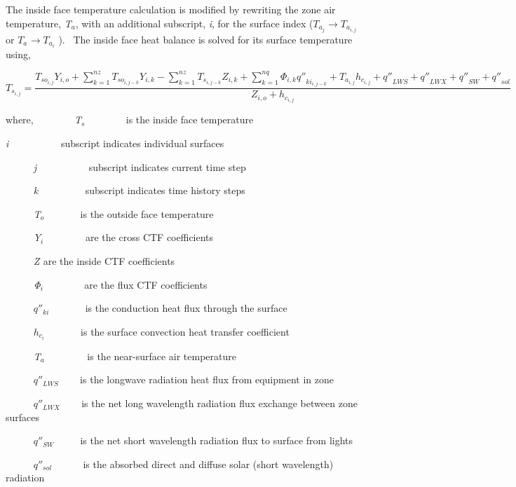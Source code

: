 The inside face temperature calculation is modified by rewriting the zone air temperature, \emph{T\(_{a}\)}, with an additional subscript, \emph{i}, for the surface index (\({T_{{a_j}}} \to {T_{{a_{i,j}}}}\) or \({T_{{a_{}}}} \to {T_{{a_i}}}\) ).~ The inside face heat balance is solved for its surface temperature using,

{\scriptsize
\begin{equation}
{T_{{s_{i,j}}}} = \frac{{{T_{s{o_{i,j}}}}{Y_{i,o}} + \sum\limits_{k = 1}^{nz} {{T_{s{o_{i,j - k}}}}} {Y_{i,k}} - \sum\limits_{k = 1}^{nz} {{T_{{s_{i,j - k}}}}} {Z_{i,k}} + \sum\limits_{k = 1}^{nq} {{\Phi_{i,k}}{{q''}_{k{i_{i,j - k}}}} + {T_{{a_{i,j}}}}{h_{{c_{i,j}}}} + {{q''}_{LWS}} + {{q''}_{LWX}} + {{q''}_{SW}} + {{q''}_{sol}}} }}{{{Z_{i,o}} + {h_{{c_{i,j}}}}}}
\end{equation}}

where, ~~~~~~~ \emph{T\(_{s}\)} ~~~~~~~ is the inside face temperature

\emph{i}~~~~~~~~~~ subscript indicates individual surfaces

~~~~~ \emph{j}~~~~~~~~~~ subscript indicates current time step

~~~~~ \emph{k}~~~~~~~~~ subscript indicates time history steps

~~~~~ \emph{T\(_{o}\)} ~~~~~~ is the outside face temperature

~~~~~ \emph{Y\(_{i}\) ~~~~~~~} are the cross CTF coefficients

~~~~~ \emph{Z\(_{ }\)} are the inside CTF coefficients

~~~~~ \emph{Φ\(_{i}\)} ~~~~~~~ are the flux CTF coefficients

~~~~~ \({q''_{ki}}\) ~~~~~~ is the conduction heat flux through the surface

~~~~~ \({h_{{c_i}}}\) ~~~~~~ is the surface convection heat transfer coefficient

~~~~~ \emph{T\(_{a}\)}~~~~~~~~ is the near-surface air temperature

~~~~~ \({q''_{LWS}}\) ~~~ is the longwave radiation heat flux from equipment in zone

~~~~~ \({q''_{LWX}}\) ~~~ is the net long wavelength radiation flux exchange between zone surfaces

~~~~~ \({q''_{SW}}\) ~~~~ is the net short wavelength radiation flux to surface from lights

~~~~~ \({q''_{sol}}\) ~~~~~ is the absorbed direct and diffuse solar (short wavelength) radiation

